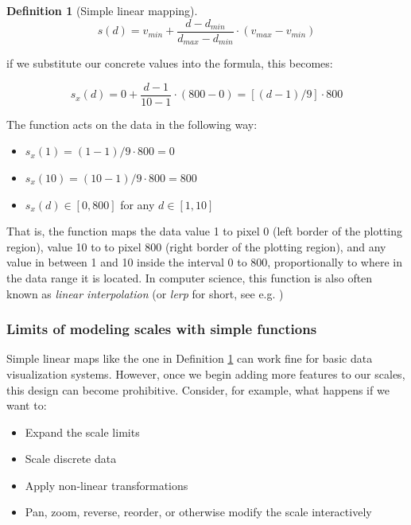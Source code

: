 \documentclass[
  openany]{book}
\providecommand{\tightlist}{%
  \setlength{\itemsep}{0pt}\setlength{\parskip}{0pt}}
\theoremstyle{definition}
\newtheorem{definition}{Definition}[chapter]
\theoremstyle{definition}
\theoremstyle{definition}
\theoremstyle{definition}
\theoremstyle{remark}
\begin{document}
\begin{definition}[Simple linear mapping]
\protect\hypertarget{def:linear-mapping}{}\label{def:linear-mapping}\[s(d) = v_{min} + \frac{d - d_{min}}{d_{max} - d_{min}} \cdot (v_{max} - v_{min})\]
\end{definition}

if we substitute our concrete values into the formula, this becomes:

\[s_x(d) = 0 + \frac{d - 1}{10 - 1} \cdot (800 - 0) = [(d - 1) / 9] \cdot 800\]

The function acts on the data in the following way:

\begin{itemize}
\tightlist
\item
  \(s_x(1) = (1 - 1) / 9 \cdot 800 = 0\)
\item
  \(s_x(10) = (10 - 1) / 9 \cdot 800 = 800\)
\item
  \(s_x(d) \in [0, 800]\) for any \(d \in [1, 10]\)
\end{itemize}

That is, the function maps the data value 1 to pixel 0 (left border of the plotting region), value 10 to to pixel 800 (right border of the plotting region), and any value in between 1 and 10 inside the interval 0 to 800, proportionally to where in the data range it is located. In computer science, this function is also often known as \emph{linear interpolation} (or \emph{lerp} for short, see e.g. )

\subsubsection{Limits of modeling scales with simple functions}\label{simple-scale-limits}

Simple linear maps like the one in Definition \ref{def:linear-mapping} can work fine for basic data visualization systems. However, once we begin adding more features to our scales, this design can become prohibitive. Consider, for example, what happens if we want to:

\begin{itemize}
\tightlist
\item
  Expand the scale limits
\item
  Scale discrete data
\item
  Apply non-linear transformations
\item
  Pan, zoom, reverse, reorder, or otherwise modify the scale interactively
\end{itemize}
\end{document}
